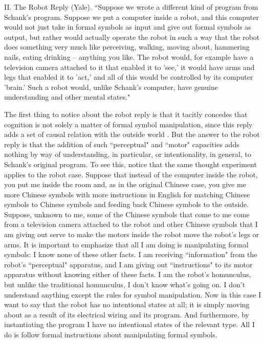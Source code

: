 II. The Robot Reply (Yale). ``Suppose we wrote a different kind of program from Schank's program. Suppose
we put a computer inside a robot, and this computer would not just take in formal symbols as input and give out
formal symbols as output, but rather would actually operate the robot in such a way that the robot does
something very much like perceiving, walking, moving about, hammering nails, eating drinking -- anything you
like. The robot would, for example have a television camera attached to it that enabled it to 'see,' it would have
arms and legs that enabled it to 'act,' and all of this would be controlled by its computer 'brain.' Such a robot
would, unlike Schank's computer, have genuine understanding and other mental states."

The first thing to notice about the robot reply is that it tacitly concedes that cognition is not solely a matter of
formal symbol manipulation, since this reply adds a set of causal relation with the outside world \autocite{Fodor1}. 
But the answer to the robot reply is that the addition of such
``perceptual" and ``motor" capacities adds nothing by way of understanding, in particular, or intentionality, in
general, to Schank's original program. To see this, notice that the same thought experiment applies to the robot
case. Suppose that instead of the computer inside the robot, you put me inside the room and, as in the original
Chinese case, you give me more Chinese symbols with more instructions in English for matching Chinese
symbols to Chinese symbols and feeding back Chinese symbols to the outside. Suppose, unknown to me, some
of the Chinese symbols that come to me come from a television camera attached to the robot and other Chinese symbols that I am giving out serve to make the motors inside the robot move the robot's legs or arms.
It is important to emphasize that all I am doing is manipulating formal symbols: I know none of these other facts.
I am receiving ``information" from the robot's ``perceptual" apparatus, and I am giving out ``instructions" to its
motor apparatus without knowing either of these facts. I am the robot's homunculus, but unlike the traditional
homunculus, I don't know what's going on. I don't understand anything except the rules for symbol
manipulation. Now in this case I want to say that the robot has no intentional states at all; it is simply moving
about as a result of its electrical wiring and its program. And furthermore, by instantiating the program I have no
intentional states of the relevant type. All I do is follow formal instructions about manipulating formal symbols.

